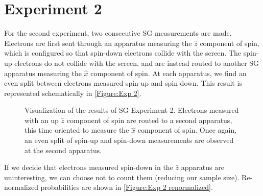 \section{Experiment 2}

For the second experiment, two consecutive SG measurements are made. Electrons are first sent through an apparatus measuring the $\hat{z}$ component of spin, which is configured so that spin-down electrons collide with the screen. The spin-up electrons do not collide with the screen, and are instead routed to another SG apparatus measuring the $\hat{x}$ component of spin. At each apparatus, we find an even split between electrons measured spin-up and spin-down. This result is represented schematically in \autoref{Figure:Exp 2}.

\begin{figure}[!t]
\centering\CaptionFontSize
{}

\caption[Results of Stern-Gerlach Experiment 2]
{Visualization of the results of SG Experiment 2. Electrons measured with an up $\hat{z}$ component of spin are routed to a second apparatus, this time oriented to measure the $\hat{x}$ component of spin. Once again, an even split of spin-up and spin-down measurements are observed at the second apparatus.}
\label{Figure:Exp 2}
\end{figure}

If we decide that electrons measured spin-down in the $\hat{z}$ apparatus are uninteresting, we can choose not to count them (reducing our sample size). Re-normalized probabilities are shown in \autoref{Figure:Exp 2 renormalized}.


